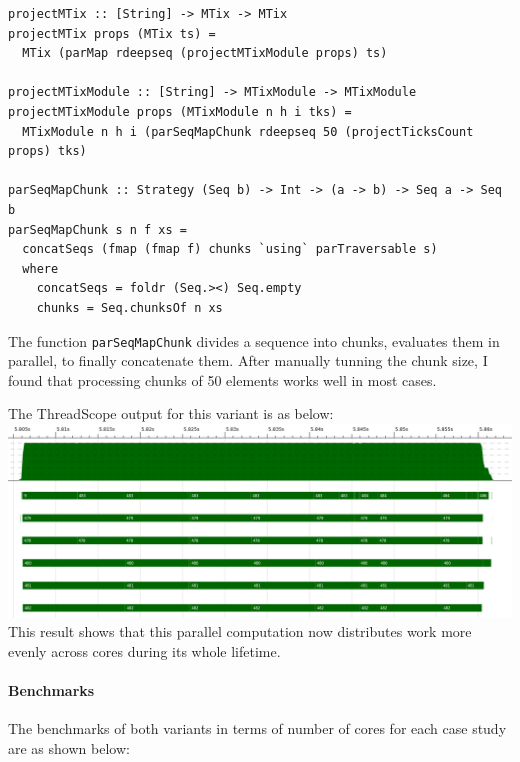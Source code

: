\documentclass[a4paper,10pt]{article}
\begin{document}
\begin{verbatim}
projectMTix :: [String] -> MTix -> MTix
projectMTix props (MTix ts) =
  MTix (parMap rdeepseq (projectMTixModule props) ts)

projectMTixModule :: [String] -> MTixModule -> MTixModule
projectMTixModule props (MTixModule n h i tks) =
  MTixModule n h i (parSeqMapChunk rdeepseq 50 (projectTicksCount props) tks)

parSeqMapChunk :: Strategy (Seq b) -> Int -> (a -> b) -> Seq a -> Seq b
parSeqMapChunk s n f xs =
  concatSeqs (fmap (fmap f) chunks `using` parTraversable s)
  where
    concatSeqs = foldr (Seq.><) Seq.empty
    chunks = Seq.chunksOf n xs
\end{verbatim}

The function \texttt{parSeqMapChunk} divides a sequence into chunks, evaluates
them in parallel, to finally concatenate them.
%
After manually tunning the chunk size, I found that processing chunks of 50
elements works well in most cases.

The ThreadScope output for this variant is as below:\\

\includegraphics[scale=0.3]{threadscope/ParProject2}\\

This result shows that this parallel computation now distributes work more
evenly across cores during its whole lifetime.

\paragraph{Benchmarks}
The benchmarks of both variants in terms of number of cores for each case study
are as shown below:\\
\end{document}
